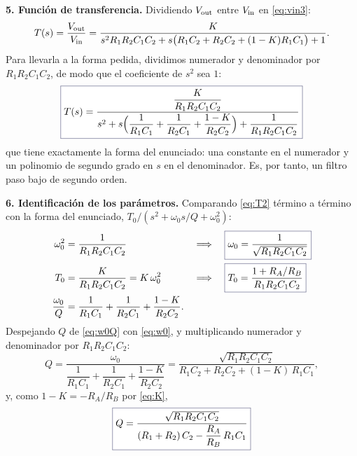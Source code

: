 \begin{resolucion}
\textbf{5. Función de transferencia.} Dividiendo $V_{\mathrm{out}}$ entre $V_{\mathrm{in}}$ en \eqref{eq:vin3}:
\begin{equation}\label{eq:T1}
  T(s)=\frac{V_{\mathrm{out}}}{V_{\mathrm{in}}}=\frac{K}{s^{2}R_1R_2C_1C_2+s\bigl(R_1C_2+R_2C_2+(1-K)R_1C_1\bigr)+1} .
\end{equation}
Para llevarla a la forma pedida, dividimos numerador y denominador por $R_1R_2C_1C_2$, de modo que el
coeficiente de $s^{2}$ sea $1$:
\begin{equation}\label{eq:T2}
  \resultado{T(s)=\frac{\dfrac{K}{R_1R_2C_1C_2}}{s^{2}+s\Bigl(\dfrac{1}{R_1C_1}+\dfrac{1}{R_2C_1}+\dfrac{1-K}{R_2C_2}\Bigr)+\dfrac{1}{R_1R_2C_1C_2}}}
\end{equation}
que tiene exactamente la forma del enunciado: una constante en el numerador y un polinomio de segundo grado
en $s$ en el denominador. Es, por tanto, un filtro paso bajo de segundo orden.

\textbf{6. Identificación de los parámetros.} Comparando \eqref{eq:T2} término a término con la forma
del enunciado, $T_0/(s^{2}+\omega_0 s/Q+\omega_0^{2})$:
\begin{align}
  \omega_0^{2}&=\frac{1}{R_1R_2C_1C_2}
  &&\Longrightarrow\quad \resultado{\omega_0=\frac{1}{\sqrt{R_1R_2C_1C_2}}}\label{eq:w0}\\
  T_0&=\frac{K}{R_1R_2C_1C_2}=K\,\omega_0^{2}
  &&\Longrightarrow\quad \resultado{T_0=\frac{1+R_A/R_B}{R_1R_2C_1C_2}}\label{eq:T0}\\
  \frac{\omega_0}{Q}&=\frac{1}{R_1C_1}+\frac{1}{R_2C_1}+\frac{1-K}{R_2C_2}. &&\label{eq:w0Q}
\end{align}
Despejando $Q$ de \eqref{eq:w0Q} con \eqref{eq:w0}, y multiplicando numerador y denominador por
$R_1R_2C_1C_2$:
\begin{equation}\label{eq:Q}
  Q=\frac{\omega_0}{\dfrac{1}{R_1C_1}+\dfrac{1}{R_2C_1}+\dfrac{1-K}{R_2C_2}}
   =\frac{\sqrt{R_1R_2C_1C_2}}{R_1C_2+R_2C_2+(1-K)\,R_1C_1} ,
\end{equation}
y, como $1-K=-R_A/R_B$ por \eqref{eq:K},
\begin{equation}\label{eq:Qfinal}
  \resultado{Q=\frac{\sqrt{R_1R_2C_1C_2}}{(R_1+R_2)\,C_2-\dfrac{R_A}{R_B}\,R_1C_1}}
\end{equation}


\end{resolucion}
